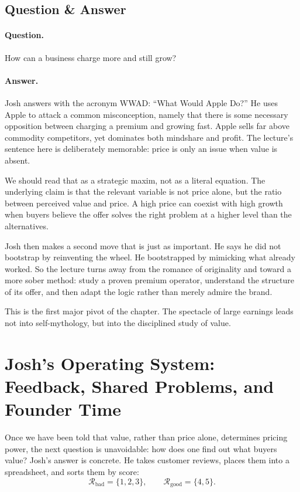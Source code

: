 \subsection{Question \& Answer}

\paragraph{Question.} How can a business charge more and still grow?

\paragraph{Answer.} Josh answers with the acronym WWAD: ``What Would Apple Do?'' He uses Apple to attack a common misconception, namely that there is some necessary opposition between charging a premium and growing fast. Apple sells far above commodity competitors, yet dominates both mindshare and profit. The lecture's sentence here is deliberately memorable: price is only an issue when value is absent.

We should read that as a strategic maxim, not as a literal equation. The underlying claim is that the relevant variable is not price alone, but the ratio between perceived value and price. A high price can coexist with high growth when buyers believe the offer solves the right problem at a higher level than the alternatives.

Josh then makes a second move that is just as important. He says he did not bootstrap by reinventing the wheel. He bootstrapped by mimicking what already worked. So the lecture turns away from the romance of originality and toward a more sober method: study a proven premium operator, understand the structure of its offer, and then adapt the logic rather than merely admire the brand.

This is the first major pivot of the chapter. The spectacle of large earnings leads not into self-mythology, but into the disciplined study of value.

\section{Josh's Operating System: Feedback, Shared Problems, and Founder Time}

Once we have been told that value, rather than price alone, determines pricing power, the next question is unavoidable: how does one find out what buyers value? Josh's answer is concrete. He takes customer reviews, places them into a spreadsheet, and sorts them by score:
\begin{equation}
\mathcal{R}_{\text{bad}}=\{1,2,3\},
\qquad
\mathcal{R}_{\text{good}}=\{4,5\}.
\end{equation}

